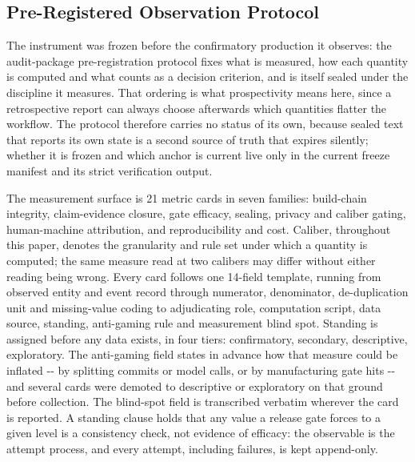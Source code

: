 \documentclass[
  english,
]{article}
\begin{document}
\subsection{Pre-Registered Observation Protocol}\label{pre-registered-observation-protocol}

The instrument was frozen before the confirmatory production it observes: the audit-package pre-registration protocol fixes what is measured, how each quantity is computed and what counts as a decision criterion, and is itself sealed under the discipline it measures. That ordering is what prospectivity means here, since a retrospective report can always choose afterwards which quantities flatter the workflow. The protocol therefore carries no status of its own, because sealed text that reports its own state is a second source of truth that expires silently; whether it is frozen and which anchor is current live only in the current freeze manifest and its strict verification output.

The measurement surface is 21 metric cards in seven families: build-chain integrity, claim-evidence closure, gate efficacy, sealing, privacy and caliber gating, human-machine attribution, and reproducibility and cost. Caliber, throughout this paper, denotes the granularity and rule set under which a quantity is computed; the same measure read at two calibers may differ without either reading being wrong. Every card follows one 14-field template, running from observed entity and event record through numerator, denominator, de-duplication unit and missing-value coding to adjudicating role, computation script, data source, standing, anti-gaming rule and measurement blind spot. Standing is assigned before any data exists, in four tiers: confirmatory, secondary, descriptive, exploratory. The anti-gaming field states in advance how that measure could be inflated -\/- by splitting commits or model calls, or by manufacturing gate hits -\/- and several cards were demoted to descriptive or exploratory on that ground before collection. The blind-spot field is transcribed verbatim wherever the card is reported. A standing clause holds that any value a release gate forces to a given level is a consistency check, not evidence of efficacy: the observable is the attempt process, and every attempt, including failures, is kept append-only.
\end{document}
